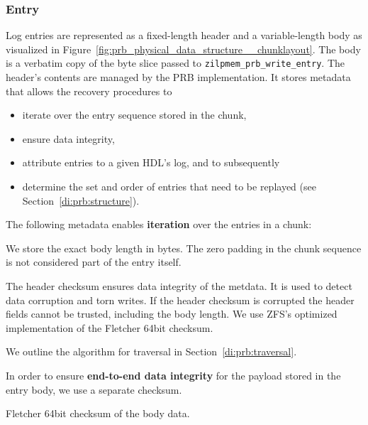 \documentclass[12pt,a4paper,twoside]{book}
\begin{document}
\subsubsection{Entry}\label{di:prb:persistent:entry}
Log entries are represented as a fixed-length header and a variable-length body as visualized in Figure~\ref{fig:prb_physical_data_structure__chunklayout}.
The body is a verbatim copy of the byte slice passed to \lstinline{zilpmem_prb_write_entry}.
The header's contents are managed by the PRB implementation.
It stores metadata that allows the recovery procedures to
\begin{itemize}[noitemsep]
    \item iterate over the entry sequence stored in the chunk,
    \item ensure data integrity,
    \item attribute entries to a given HDL's log, and to subsequently
    \item determine the set and order of entries that need to be replayed (see Section~\ref{di:prb:structure}).
\end{itemize}

The following metadata enables \textbf{iteration} over the entries in a chunk:
\begin{description}[noitemsep,leftmargin=1.5cm,labelindent=1cm]
    \item[Body Length] We store the exact body length in bytes. The zero padding in the chunk sequence is not considered part of the entry itself.
    \item[Header Checksum] The header checksum ensures data integrity of the metdata. It is used to detect data corruption and torn writes.
    If the header checksum is corrupted the header fields cannot be trusted, including the body length.
    We use ZFS's optimized implementation of the Fletcher 64bit checksum.
\end{description}
We outline the algorithm for traversal in Section~\ref{di:prb:traversal}.

In order to ensure \textbf{end-to-end data integrity} for the payload stored in the entry body, we use a separate checksum.
\begin{description}[noitemsep,leftmargin=1.5cm,labelindent=1cm]
    \item[Body Checksum] Fletcher 64bit checksum of the body data.
\end{description}
\end{document}
